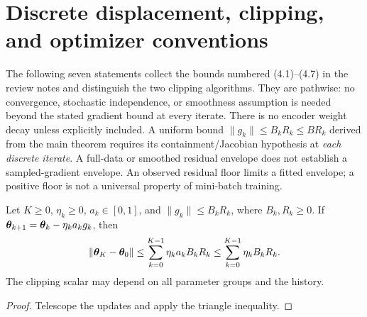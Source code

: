 \section{Discrete displacement, clipping, and optimizer conventions}
\label{sec:astra_discrete}
The following seven statements collect the bounds numbered (4.1)--(4.7)
in the review notes and distinguish the two clipping algorithms. They are
pathwise: no convergence, stochastic independence, or smoothness assumption
is needed beyond the stated gradient bound at every iterate. There is no
encoder weight decay unless explicitly included. A uniform bound
$\|g_k\|\le B_kR_k\le BR_k$ derived from the main theorem requires its
containment/Jacobian hypothesis at \emph{each discrete iterate}. A full-data
or smoothed residual envelope does not establish a sampled-gradient envelope.
An observed residual floor limits a fitted envelope; a positive floor is
not a universal property of mini-batch training.

\begin{lemma}
\label{lem:astra_gd}
Let $K\ge0$, $\eta_k\ge0$, $a_k\in[0,1]$, and
$\|g_k\|\le B_kR_k$, where $B_k,R_k\ge0$. If
${\boldsymbol{\theta}}_{k+1}={\boldsymbol{\theta}}_k-\eta_ka_kg_k$, then
\begin{equation}\label{eq:astra_gd}
 \|{\boldsymbol{\theta}}_K-{\boldsymbol{\theta}}_0\|
 \le\sum_{k=0}^{K-1}\eta_ka_kB_kR_k
 \le\sum_{k=0}^{K-1}\eta_kB_kR_k.
\end{equation}
The clipping scalar may depend on all parameter groups and the history.
\end{lemma}
\begin{proof}
Telescope the updates and apply the triangle inequality.
\end{proof}

